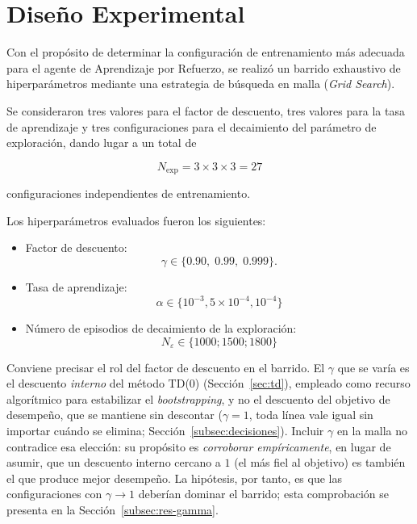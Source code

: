 \section{Diseño Experimental}
\label{sec:experimentos}

Con el propósito de determinar la configuración de entrenamiento más adecuada para el agente de Aprendizaje por Refuerzo, se realizó un barrido exhaustivo de hiperparámetros mediante una estrategia de búsqueda en malla (\emph{Grid Search}).

Se consideraron tres valores para el factor de descuento, tres valores para la tasa de aprendizaje y tres configuraciones para el decaimiento del parámetro de exploración, dando lugar a un total de

\begin{equation}
N_{\text{exp}} = 3 \times 3 \times 3 = 27
\end{equation}

configuraciones independientes de entrenamiento.

Los hiperparámetros evaluados fueron los siguientes:

\begin{itemize}
\item Factor de descuento:
\begin{equation}
\gamma \in \{0.90,\;0.99,\;0.999\}.
\end{equation}

\item Tasa de aprendizaje:
\begin{equation}
\alpha \in \{ {10^{-3}, 5\times10^{-4}, 10^{-4}} \} 
\end{equation}

\item Número de episodios de decaimiento de la exploración:
\begin{equation}
N_{\varepsilon}
\in
\{1000;1500;1800 \}
\end{equation}
\end{itemize}

Conviene precisar el rol del factor de descuento en el barrido. El $\gamma$ que se varía es el descuento \emph{interno} del método TD(0) (Sección~\ref{sec:td}), empleado como recurso algorítmico para estabilizar el \emph{bootstrapping}, y no el descuento del objetivo de desempeño, que se mantiene sin descontar ($\gamma = 1$, toda línea vale igual sin importar cuándo se elimina; Sección~\ref{subsec:decisiones}). Incluir $\gamma$ en la malla no contradice esa elección: su propósito es \emph{corroborar empíricamente}, en lugar de asumir, que un descuento interno cercano a $1$ (el más fiel al objetivo) es también el que produce mejor desempeño. La hipótesis, por tanto, es que las configuraciones con $\gamma \to 1$ deberían dominar el barrido; esta comprobación se presenta en la Sección~\ref{subsec:res-gamma}.

